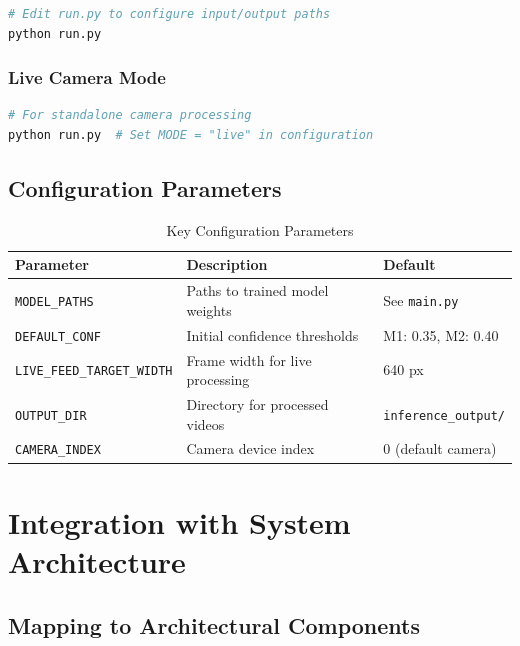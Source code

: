 \documentclass[12pt]{article}
\begin{document}
\begin{lstlisting}[language=bash]
# Edit run.py to configure input/output paths
python run.py
\end{lstlisting}

\subsubsection*{Live Camera Mode}

\begin{lstlisting}[language=bash]
# For standalone camera processing
python run.py  # Set MODE = "live" in configuration
\end{lstlisting}

\subsection{Configuration Parameters}

\begin{table}[H]
    \centering
    \caption{Key Configuration Parameters}
    \label{tab:config-params}
    \begin{tabular}{p{}p{}l}
        \toprule
        \textbf{Parameter} & \textbf{Description} & \textbf{Default} \\
        \midrule
        \texttt{MODEL\_PATHS} & Paths to trained model weights & See \texttt{main.py} \\
        \texttt{DEFAULT\_CONF} & Initial confidence thresholds & M1: 0.35, M2: 0.40 \\
        \texttt{LIVE\_FEED\_TARGET\_WIDTH} & Frame width for live processing & 640 px \\
        \texttt{OUTPUT\_DIR} & Directory for processed videos & \texttt{inference\_output/} \\
        \texttt{CAMERA\_INDEX} & Camera device index & 0 (default camera) \\
        \bottomrule
    \end{tabular}
\end{table}

\clearpage

\section{Integration with System Architecture}

\subsection{Mapping to Architectural Components}
\end{document}
